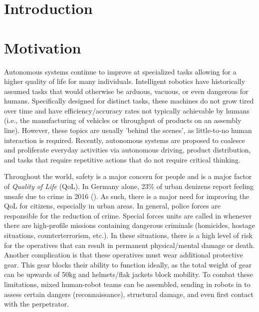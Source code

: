 \chapter{Introduction}
\label{introduction}





\chapter{Motivation}

Autonomous systems continue to improve at specialized tasks allowing for a higher quality of life for many individuals. Intelligent robotics have historically assumed tasks that would otherwise be arduous, vacuous, or even dangerous for humans. Specifically designed for distinct tasks, these machines do not grow tired over time and have efficiency/accuracy rates not typically achievable by humans (i.e., the manufacturing of vehicles or throughput of products on an assembly line). However, these topics are usually 'behind the scenes', as little-to-no human interaction is required. Recently, autonomous systems are proposed to coalesce and proliferate everyday activities via autonomous driving, product distribution, and tasks that require repetitive actions that do not require critical thinking. 
\smallskip

Throughout the world, safety is a major concern for people and is a major factor of \textit{Quality of Life} (QoL). In Germany alone, 23\% of urban denizens report feeling unsafe due to crime in 2016 (\cite{eurostat}). As such, there is a major need for improving the QoL for citizens, especially in urban areas. In general, police forces are responsible for the reduction of crime. Special forces units are called in whenever there are high-profile missions containing dangerous criminals (homicides, hostage situations, counterterrorism, etc.). In these situations, there is a high level of risk for the operatives that can result in permanent physical/mental damage or death. Another complication is that these operatives must wear additional protective gear. This gear blocks their ability to function ideally, as the total weight of gear can be upwards of 50kg and helmets/flak jackets block mobility. To combat these limitations, mixed human-robot teams can be assembled, sending in robots in to assess certain dangers (reconnaissance), structural damage, and even first contact with the perpetrator. 
\smallskip


